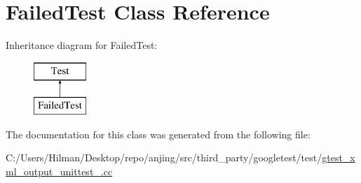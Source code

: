 \hypertarget{class_failed_test}{}\section{Failed\+Test Class Reference}
\label{class_failed_test}
Inheritance diagram for Failed\+Test\+:\begin{figure}[H]
\begin{center}
\leavevmode
\includegraphics[height=2.000000cm]{class_failed_test}
\end{center}
\end{figure}


The documentation for this class was generated from the following file\+:\begin{DoxyCompactItemize}
\item 
C\+:/\+Users/\+Hilman/\+Desktop/repo/anjing/src/third\+\_\+party/googletest/test/\hyperlink{gtest__xml__output__unittest___8cc}{gtest\+\_\+xml\+\_\+output\+\_\+unittest\+\_\+.\+cc}\end{DoxyCompactItemize}
